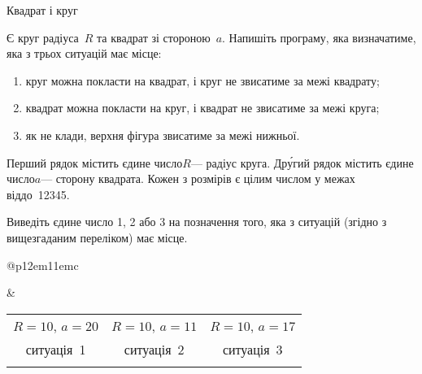 \begin{problemAllDefault}{Квадрат і круг}

Є круг радіуса~$R$ та квадрат зі стороною~$a$. Напишіть програму, яка визначатиме, яка з трьох ситуацій має місце:
\begin{enumerate}
\item
круг можна покласти на квадрат, і круг не звисатиме за межі квадрату;
\item
квадрат можна покласти на круг, і квадрат не звисатиме за межі круга;
\item
як не клади, верхня фігура звисатиме за межі нижньої.
\end{enumerate}

\InputFile
Перший рядок містить єдине число\nolinebreak[3] $R$\nolinebreak[3] --- радіус круга. Др\'{у}гий рядок містить єдине число\nolinebreak[3] $a$\nolinebreak[3] --- сторону квадрата. Кожен з розмірів є цілим числом у межах від\nolinebreak[2] до~12345. 

\OutputFile
Виведіть єдине число 1, 2 або 3 на позначення того, яка з ситуацій (згідно з вищезгаданим переліком) має місце.

\Examples

\begin{tabular}{@{}p{\ifAfour 12em\else 11em\fi}c}
\begin{exampleSimple}{5em}{5em}
%
%
%
\end{exampleSimple}
&
\begin{tabular}{|c|c|c|}
\hline
$R{=}10$, $a{=}20$ &
$R{=}10$, $a{=}11$ &
$R{=}10$, $a{=}17$ 
\\
ситуація \textnumero$\,$1 &
ситуація \textnumero$\,$2 &
ситуація \textnumero$\,$3 
\\
\begin{mfpic}[3]{-10}{10}{-10}{10}
\rhatch\rect{(-10,-10),(10,10)}
\rect{(-10,-10),(10,10)}
\gclear\circle{(0,0),10}
\lhatch\circle{(0,0),10}
\circle{(0,0),10}
\end{mfpic}
&
\begin{mfpic}[3]{-10}{10}{-10}{10}
\lhatch\circle{(0,0),10}
\circle{(0,0),10}
\gclear\rect{(-5.5,-5.5),(5.5,5.5)}
\rhatch\rect{(-5.5,-5.5),(5.5,5.5)}
\rect{(-5.5,-5.5),(5.5,5.5)}
\end{mfpic}
&
\begin{mfpic}[3]{-10}{10}{-10}{10}
\rhatch\rect{(-8.5,-8.5),(8.5,8.5)}
\rect{(-8.5,-8.5),(8.5,8.5)}
\gclear\circle{(0,0),10}
\lhatch\circle{(0,0),10}
\circle{(0,0),10}
\end{mfpic}
\\\hline
\end{tabular}
\end{tabular}

\end{problemAllDefault}

